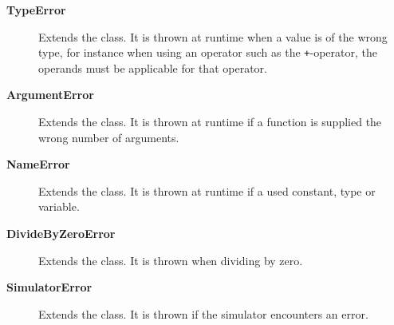 \begin{description}
\item[\textbf{TypeError}] Extends the  class. It is
  thrown at runtime when a value is of the wrong type, for instance when using
  an operator such as the \texttt{+}-operator, the operands must be applicable
  for that operator.

\item[\textbf{ArgumentError}] Extends the  class. It is
  thrown at runtime if a function is supplied the wrong number of arguments.

\item[\textbf{NameError}] Extends the  class. It is
  thrown at runtime if a used constant, type or variable.

\item[\textbf{DivideByZeroError}] Extends the  class. It
  is thrown when dividing by zero.

\item[\textbf{SimulatorError}] Extends the  class. It is thrown
  if the simulator encounters an error.
\end{description}


    
